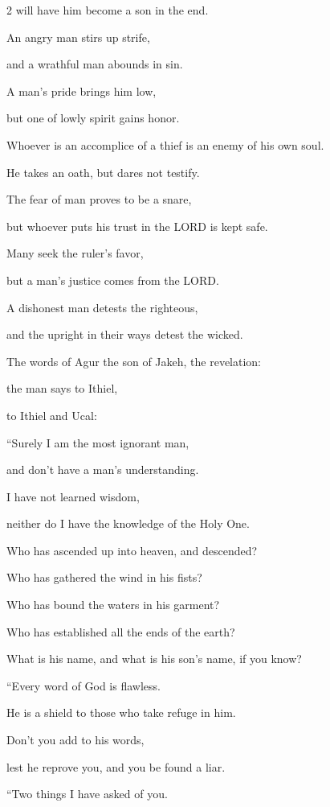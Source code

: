 \begin{multicols}{2}
will have him become a son in the end.


\myverse{}An angry man stirs up strife,

and a wrathful man abounds in sin.


\myverse{}A man’s pride brings him low,

but one of lowly spirit gains honor.


\myverse{}Whoever is an accomplice of a thief is an enemy of his own
soul.

He takes an oath, but dares not testify.


\myverse{}The fear of man proves to be a snare,

but whoever puts his trust in the LORD is kept safe.


\myverse{}Many seek the ruler’s favor,

but a man’s justice comes from the LORD.


\myverse{}A dishonest man detests the righteous,

and the upright in their ways detest the wicked.


\mychapter{} \myverse*{}The words of Agur the son of Jakeh, the revelation:

the man says to Ithiel,

to Ithiel and Ucal:


\myverse{}“Surely I am the most ignorant man,

and don’t have a man’s understanding.


\myverse{}I have not learned wisdom,

neither do I have the knowledge of the Holy One.


\myverse{}Who has ascended up into heaven, and descended?

Who has gathered the wind in his fists?

Who has bound the waters in his garment?

Who has established all the ends of the earth?

What is his name, and what is his son’s name, if you know?


\vspace{\baselineskip} 
\myverse{}“Every word of God is flawless.

He is a shield to those who take refuge in him.


\myverse{}Don’t you add to his words,

lest he reprove you, and you be found a liar.


\vspace{\baselineskip} 
\myverse{}“Two things I have asked of you.


\end{multicols}
